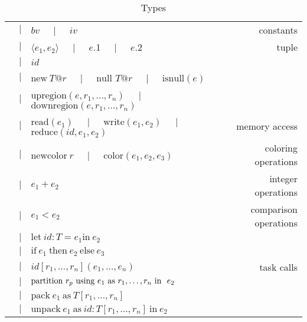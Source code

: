 \begin{table*}
{\begin{tabular}{cclr}
  &$\mid$& $bv$ $\;\;\;\mid\;\;\;$ $iv$ & constants \\
  &$\mid$& $\langle e_1, e_2 \rangle$ $\;\;\;\mid\;\;\;$ $e$.1 $\;\;\;\mid\;\;\;$ $e$.2 & tuple \\
  &$\mid$& $id$ &  \\
  &$\mid$& $\text{new}\ T@r$ $\;\;\;\mid\;\;\;$ $\text{null }T@r$ $\;\;\;\mid\;\;\;$ $\text{isnull}(e)$ & \\
  &$\mid$& $\text{upregion}(e, r_1,\ldots,r_n)$ $\;\;\;\mid\;\;\;$ $\text{downregion}(e, r_1,\ldots,r_n)$ & \\
  &$\mid$& $\text{read}(e_1)$ $\;\;\;\mid\;\;\;$ $\text{write}(e_1, e_2)$ $\;\;\;\mid\;\;\;$ $\text{reduce}(id, e_1, e_2)$ & memory access \\
  &$\mid$& $\text{newcolor}\ r$ $\;\;\;\mid\;\;\;$ $\text{color}(e_1, e_2, e_3)$ & coloring operations \\
  &$\mid$& $e_1 + e_2$ & integer operations \\
  &$\mid$& $e_1 < e_2$ & comparison operations \\
  &$\mid$& $\text{let}\ id : T = e_1 \text{in}\ e_2$ &  \\
  &$\mid$& $\text{if}\ e_1\ \text{then}\ e_2\ \text{else}\ e_3$ &  \\
  &$\mid$& $id[r_1, \ldots, r_n](e_1,\ldots,e_n)$ & task calls \\
  &$\mid$& $\text{partition}\ r_p\text{ using }e_1\text{ as }{r}_1,\ldots,{r}_n\text{ in }\ e_2$ &  \\
  &$\mid$& $\text{pack}\ e_1\ \text{as}\ T[r_1,\ldots,r_n]$ &  \\
  &$\mid$& $\text{unpack}\ e_1\ \text{as}\ id : T[r_1,\ldots,r_n]\ \text{in}\ e_2$ &  \\

\end{tabular}
}
\caption{Types}
\end{table*}

\newcommand{\cinfrule}[3]{\parbox{14cm}{\hfil$\infrule{#1}{#2}$\hfil}\parbox{4cm}{$\,#3$\hfil}}
\newcommand{\finfrule}[2]{\vspace{10pt}\framebox{$\infrule{#1}{#2}$}\vspace{10pt}}

\newcommand{\infx}[2]{\infrule{\begin{array}{l}{#1}\end{array}}{#2}}

\pagebreak

